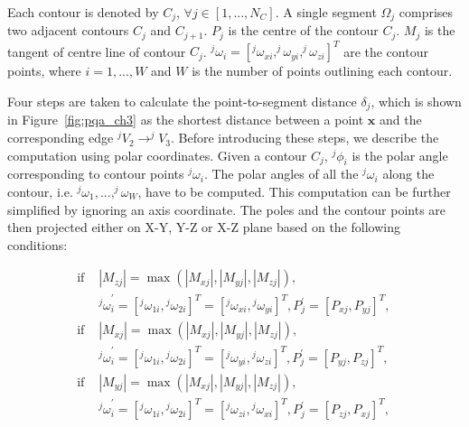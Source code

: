 \begin{mydef}
Each contour is denoted by $C_j$, $\forall j \in [1,...,N_C]$.
A single segment $\Omega_j$ comprises two adjacent contours $C_j$ and $C_{j+1}$.
$P_j$ is the centre of the contour $C_j$.
$M_j$ is the tangent of centre line of contour $C_j$.
$^j\omega_i=[^j\omega_{xi},^j\omega_{yi},^j\omega_{zi}]^T$ are the contour points,
where $i=1,...,W$ and $W$ is the number of points outlining each contour.
\end{mydef}

Four steps are taken to calculate the point-to-segment distance $\delta_j$, which is shown in Figure~\ref{fig:pqa_ch3} as the shortest distance between a point $\textbf{x}$ and the corresponding edge $^jV_2 \rightarrow ^jV_3$.
Before introducing these steps, we describe the computation using polar coordinates.
Given a contour $C_j$, $^j\phi_i$ is the polar angle corresponding to contour points $^j\omega_i$.
The polar angles of all the $^j\omega_i$ along the contour, i.e. $^j\omega_1, ..., ^j\omega_W$, have to be computed. 
This computation can be further simplified by ignoring an axis coordinate. 
The poles and the contour points are then projected either on X-Y, Y-Z or X-Z plane based on the following conditions:   

\begin{equation}
\begin{aligned}
\mbox{if } &|M_{zj}| = \max \left ( {|M_{xj}|,|M_{yj}|,|M_{zj}|} \right ) \mbox{, } \\
&{^j\omega}^{\prime}_i = [{^j\omega}_{1i},{^j\omega}_{2i}]^T = [{^j\omega}_{xi},{^j\omega}_{yi}]^T, P^{\prime}_j=[P_{xj},P_{yj}]^T \mbox{, } \\
\mbox{if } &|M_{xj}| = \max \left ( {|M_{xj}|,|M_{yj}|,|M_{zj}|} \right ) \mbox{, } \\
&{^j\omega}^{\prime}_i = [{^j\omega}_{1i},{^j\omega}_{2i}]^T = [{^j\omega}_{yi},{^j\omega}_{zi}]^T, P^{\prime}_j=[P_{yj},P_{zj}]^T \mbox{, } \\
\mbox{if } &|M_{yj}| = \max \left ( {|M_{xj}|,|M_{yj}|,|M_{zj}|} \right ) \mbox{, } \\
&{^j\omega}^{\prime}_i = [{^j\omega}_{1i},{^j\omega}_{2i}]^T = [{^j\omega}_{zi},{^j\omega}_{xi}]^T, P^{\prime}_j=[P_{zj},P_{xj}]^T \mbox{, } 
\end{aligned}
\label{eqt:preprocess1}
\end{equation}

